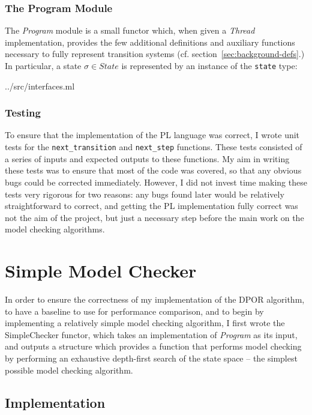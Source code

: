 \documentclass[12pt,a4paper,twoside,openright]{report}
\begin{document}
\subsubsection{The Program Module}
The \emph{Program} module is a small functor which,
when given a \emph{Thread} implementation, provides 
the few additional definitions and auxiliary
functions necessary to fully represent
transition systems (cf. section~\ref{sec:background-defs}.)
In particular, a state $\sigma \in \textit{State}$ is
represented by an instance of the \texttt{state} type:

	{../src/interfaces.ml}

\subsubsection{Testing}
To ensure that the implementation of the PL
language was correct, I wrote unit tests for
the \texttt{next\_transition} and
\texttt{next\_step} functions. These tests
consisted of a series of inputs and expected outputs
to these functions. My aim in writing these tests
was to ensure that most of the code was covered,
so that any obvious bugs could be corrected
immediately. However, I did not invest time
making these tests very rigorous for two reasons:
any bugs found later would be relatively straightforward
to correct, and getting the PL implementation
fully correct was not the aim of the project, but
just a necessary step before the main work on the
model checking algorithms.

\section{Simple Model Checker}

In order to ensure the correctness of my implementation
of the DPOR algorithm, to have a baseline to use
for performance comparison, and to begin by implementing
a relatively simple model checking algorithm, I first wrote the
SimpleChecker functor, which takes an implementation of
\emph{Program} as its input, and outputs a structure
which provides
a function that performs model checking by performing
an exhaustive depth-first search of the state space --
the simplest possible model checking algorithm.


\subsection{Implementation}
\label{sec:simple-imp}
\end{document}
